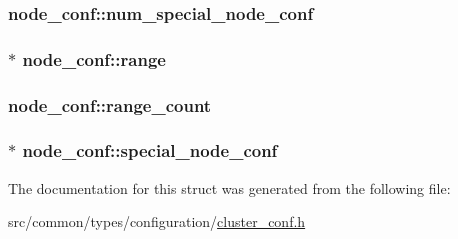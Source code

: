 \subsubsection[{\texorpdfstring{num\+\_\+special\+\_\+node\+\_\+conf}{num_special_node_conf}}]{ node\+\_\+conf\+::num\+\_\+special\+\_\+node\+\_\+conf}\hypertarget{structnode__conf_a9becaf4872ace6b670b60d308aa48364}{}\label{structnode__conf_a9becaf4872ace6b670b60d308aa48364}
\subsubsection[{\texorpdfstring{range}{range}}]{$\ast$ node\+\_\+conf\+::range}\hypertarget{structnode__conf_a5394f43cda2a680737d64fe562d4d440}{}\label{structnode__conf_a5394f43cda2a680737d64fe562d4d440}
\subsubsection[{\texorpdfstring{range\+\_\+count}{range_count}}]{ node\+\_\+conf\+::range\+\_\+count}\hypertarget{structnode__conf_a80ef5a0787f5753bd1503edf8c40b853}{}\label{structnode__conf_a80ef5a0787f5753bd1503edf8c40b853}
\subsubsection[{\texorpdfstring{special\+\_\+node\+\_\+conf}{special_node_conf}}]{$\ast$ node\+\_\+conf\+::special\+\_\+node\+\_\+conf}\hypertarget{structnode__conf_ac4f955d9d7981a220b1827f9301c952f}{}\label{structnode__conf_ac4f955d9d7981a220b1827f9301c952f}


The documentation for this struct was generated from the following file\+:\begin{DoxyCompactItemize}
\item 
src/common/types/configuration/\hyperlink{cluster__conf_8h}{cluster\+\_\+conf.\+h}\end{DoxyCompactItemize}
